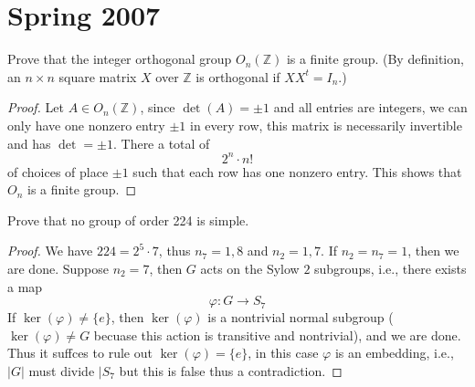 \documentclass[openany]{book}
\newcommand{\Z}{\mathbb{Z}}
\begin{document}
\chapter{Spring 2007}



\begin{prob}
    Prove that the integer orthogonal group \(O_n(\mathbb{Z})\) is a finite group. (By definition, an \(n \times n\) square matrix \(X\) over \(\mathbb{Z}\) is orthogonal if \(XX^t = I_n\).)
\end{prob}
\begin{proof}
    Let $A\in O_n(\Z)$, since $\det(A)=\pm 1$ and all entries are integers, we can only have one nonzero entry $\pm 1$ in every row, this matrix is necessarily invertible and has $\det=\pm 1$. There a total of 
    \begin{equation*}
        2^n\cdot n!
    \end{equation*}
    of choices of place $\pm1$ such that each row has one nonzero entry. This shows that $O_n$ is a finite group.
\end{proof}

\begin{prob}
    Prove that no group of order 224 is simple.
\end{prob}
\begin{proof}
    We have $224=2^5\cdot 7$, thus $n_7=1,8$ and $n_2=1,7$. If $n_2=n_7=1$, then we are done. Suppose $n_2=7$, then $G$ acts on the Sylow $2$ subgroups, i.e., there exists a map 
    \begin{equation*}
        \varphi: G\to S_7
    \end{equation*}
    If $\ker(\varphi)\neq \{e\}$, then $\ker(\varphi)$ is a nontrivial normal subgroup ($\ker(\varphi)\neq G$ becuase this action is transitive and nontrivial), and we are done.  Thus it suffces to rule out $\ker(\varphi)=\{e\}$, in this case $\varphi$ is an embedding, i.e., $|G|$ must divide $|S_7$ but this is false thus a contradiction. 
\end{proof}
\end{document}
